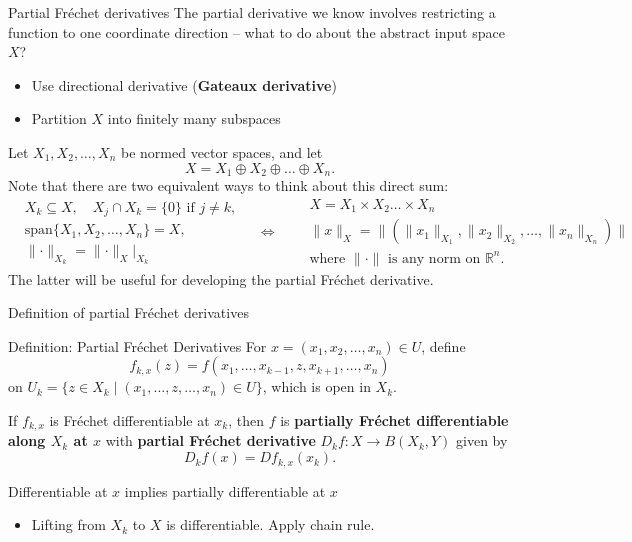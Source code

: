 \documentclass[]{beamer}
\begin{document}
	\begin{frame}{Partial Fréchet derivatives}
		The partial derivative we know involves restricting a function to one coordinate direction -- what to do about the abstract input space $X$?
		\begin{itemize}
			\item Use directional derivative (\textbf{Gateaux derivative})
			\item Partition $X$ into finitely many subspaces
		\end{itemize}
		\vfill
		Let $X_1, X_2, \dots, X_n$ be normed vector spaces, and let
		\begin{equation*}
			X = X_1 \oplus X_2 \oplus \dots \oplus X_n.
		\end{equation*}
		Note that there are two equivalent ways to think about this direct sum:
		{\tiny
		\begin{equation*}
			\begin{split}
				&X_k \subseteq X, \quad X_j \cap X_k = \{0\} \text{ if } j \ne k, \\
				&\mathrm{span}\{X_1, X_2, \dots, X_n\} = X, \\
				&\lVert \cdot \rVert_{X_k} = \lVert \cdot \rVert_X \big\vert_{X_k}
			\end{split}
			\quad \iff \quad
			\begin{split}
				&X = X_1 \times X_2 \dots \times X_n \\
				&\lVert x \rVert_X = \lVert (\lVert x_1\rVert_{X_1}, \lVert x_2\rVert_{X_2}, \dots, \lVert x_n\rVert_{X_n})\rVert\\
				&\text{where $\lVert\cdot\rVert$ is any norm on $\mathbb{R}^n$}.
			\end{split}
		\end{equation*}
		}%
		The latter will be useful for developing the partial Fréchet derivative.
	\end{frame}
	
	\begin{frame}{Definition of partial Fréchet derivatives}
		\begin{block}{Definition: Partial Fréchet Derivatives}
			For $x = (x_1, x_2, \dots, x_n) \in U$, define
			\begin{equation*}
				f_{k,x}(z) = f(x_1, \dots, x_{k-1}, z, x_{k+1},\dots, x_n)
			\end{equation*}
			on $U_k = \{z \in X_k \mid (x_1, \dots, z, \dots, x_n) \in U\}$, which is open in $X_k$. 
			\vspace{1em}
			
			If $f_{k,x}$ is Fréchet differentiable at $x_k$, then $f$ is \textbf{partially Fréchet differentiable along $X_k$ at $x$} with \textbf{partial Fréchet derivative} $D_kf : X \to B(X_k,Y)$ given by
			\begin{equation*}
				D_kf(x) = Df_{k,x}(x_k).
			\end{equation*}
		\end{block}
		\vfill
		Differentiable at $x$ implies partially differentiable at $x$
		\begin{itemize}
			\item Lifting from $X_k$ to $X$ is differentiable. Apply chain rule.
		\end{itemize}
	\end{frame}
	
\end{document}
